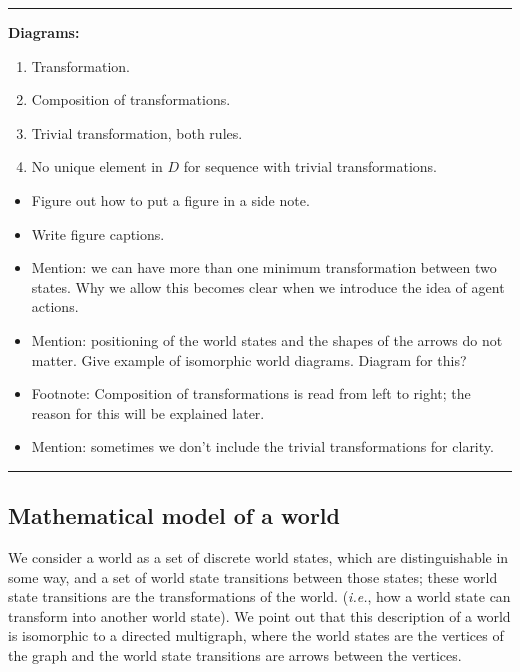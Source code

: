 \noindent\rule{\textwidth}{1mm}


\textbf{Diagrams:}
\begin{enumerate}
    \item Transformation.
    \item Composition of transformations.
    \item Trivial transformation, both rules.
    \item No unique element in $D$ for sequence with trivial transformations.
\end{enumerate}

\begin{itemize}
    \item Figure out how to put a figure in a side note.
    \item Write figure captions.

    \item Mention: we can have more than one minimum transformation between two states. Why we allow this becomes clear when we introduce the idea of agent actions.
    \item Mention: positioning of the world states and the shapes of the arrows do not matter. Give example of isomorphic world diagrams. Diagram for this?
    \item Footnote: Composition of transformations is read from left to right; the reason for this will be explained later.
    \item Mention: sometimes we don't include the trivial transformations for clarity.
\end{itemize}

\noindent\rule{\textwidth}{1mm}

\subsection{Mathematical model of a world}

We consider a world as a set of discrete world states, which are distinguishable in some way, and a set of world state transitions between those states; these world state transitions are the transformations of the world. (\textit{i.e.}, how a world state can transform into another world state).
We point out that this description of a world is isomorphic to a directed multigraph, where the world states are the vertices of the graph and the world state transitions are arrows between the vertices.


